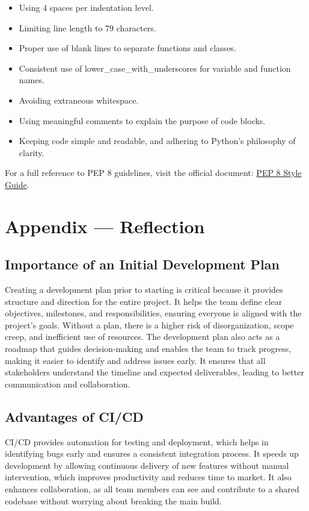 \documentclass{article}
\begin{document}
\begin{itemize}
    \item Using 4 spaces per indentation level.
    \item Limiting line length to 79 characters.
    \item Proper use of blank lines to separate functions and classes.
    \item Consistent use of lower\_case\_with\_underscores for variable and
    function names.
    \item Avoiding extraneous whitespace.
    \item Using meaningful comments to explain the purpose of code blocks.
    \item Keeping code simple and readable, and adhering to Python’s philosophy
    of clarity.
    
\end{itemize}

For a full reference to PEP 8 guidelines, visit the official document:
\href{https://peps.python.org/pep-0008/}{PEP 8 Style Guide}.


\newpage{}

\section*{Appendix --- Reflection}

\subsection*{Importance of an Initial Development Plan}
Creating a development plan prior to starting is critical because it provides
structure and direction for the entire project. It helps the team define clear
objectives, milestones, and responsibilities, ensuring everyone is aligned with
the project's goals. Without a plan, there is a higher risk of disorganization,
scope creep, and inefficient use of resources. The development plan also acts as
a roadmap that guides decision-making and enables the team to track progress,
making it easier to identify and address issues early. It ensures that all
stakeholders understand the timeline and expected deliverables, leading to
better communication and collaboration.

\subsection*{Advantages of CI/CD}
CI/CD provides automation for testing and deployment, which helps in identifying
bugs early and ensures a consistent integration process. It speeds up
development by allowing continuous delivery of new features without manual
intervention, which improves productivity and reduces time to market. It also
enhances collaboration, as all team members can see and contribute to a shared
codebase without worrying about breaking the main build.
\end{document}
